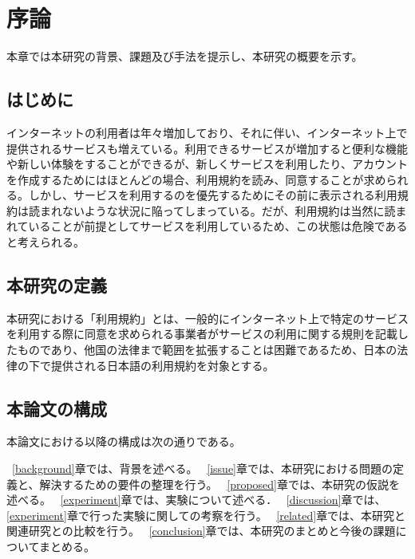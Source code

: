 \chapter{序論}
\label{introduction}

本章では本研究の背景、課題及び手法を提示し、本研究の概要を示す。

\section{はじめに}
\label{introduction:background}
インターネットの利用者は年々増加しており、それに伴い、インターネット上で提供されるサービスも増えている。利用できるサービスが増加すると便利な機能や新しい体験をすることができるが、新しくサービスを利用したり、アカウントを作成するためにはほとんどの場合、利用規約を読み、同意することが求められる。しかし、サービスを利用するのを優先するためにその前に表示される利用規約は読まれないような状況に陥ってしまっている。だが、利用規約は当然に読まれていることが前提としてサービスを利用しているため、この状態は危険であると考えられる。

\section{本研究の定義}
本研究における「利用規約」とは、一般的にインターネット上で特定のサービスを利用する際に同意を求められる事業者がサービスの利用に関する規則を記載したものであり、他国の法律まで範囲を拡張することは困難であるため、日本の法律の下で提供される日本語の利用規約を対象とする。

\section{本論文の構成}
本論文における以降の構成は次の通りである。

~\ref{background}章では、背景を述べる。
~\ref{issue}章では、本研究における問題の定義と、解決するための要件の整理を行う。
~\ref{proposed}章では、本研究の仮説を述べる。
~\ref{experiment}章では、実験について述べる．
~\ref{discussion}章では、\ref{experiment}章で行った実験に関しての考察を行う。
~\ref{related}章では、本研究と関連研究との比較を行う。
~\ref{conclusion}章では、本研究のまとめと今後の課題についてまとめる。


